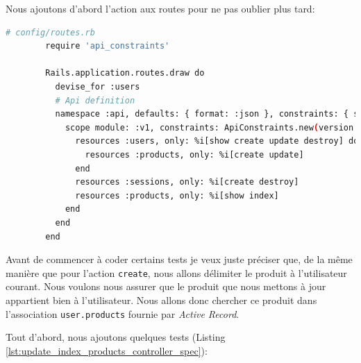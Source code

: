 \documentclass[]{report}
\begin{document}
      Nous ajoutons d'abord l'action aux routes pour ne pas oublier plus tard:

      \begin{scriptsize}
        \begin{lstlisting}[language=bash]
        # config/routes.rb
        require 'api_constraints'

        Rails.application.routes.draw do
          devise_for :users
          # Api definition
          namespace :api, defaults: { format: :json }, constraints: { subdomain: 'api' }, path: '/' do
            scope module: :v1, constraints: ApiConstraints.new(version: 1, default: true) do
              resources :users, only: %i[show create update destroy] do
                resources :products, only: %i[create update]
              end
              resources :sessions, only: %i[create destroy]
              resources :products, only: %i[show index]
            end
          end
        end
        \end{lstlisting}
      \end{scriptsize}

      Avant de commencer à coder certains tests je veux juste préciser que, de la même manière que pour l'action \verb|create|, nous allons délimiter le produit à l'utilisateur courant. Nous voulons nous assurer que le produit que nous mettons à jour appartient bien à l'utilisateur. Nous allons donc chercher ce produit dans l'association \verb|user.products| fournie par \textit{Active Record}.

      Tout d'abord, nous ajoutons quelques tests (Listing \ref{lst:update_index_products_controller_spec}):
\end{document}
